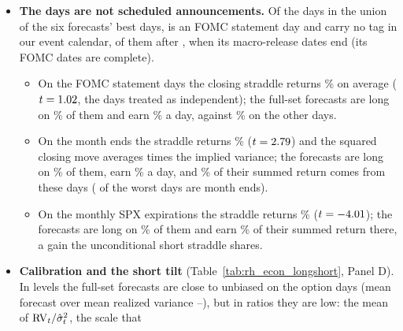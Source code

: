 \begin{itemize}
\begin{itemize}
  \item The largest, \rhedTopDate, returned \rhedTopR\% of the premium on a closing-half-hour move of
    \rhedTopMove\% (realized variance \rhedTopRVIV{} times the implied), \rhedTopShareMin--\rhedTopShareMax\% of each
    full-set strategy's summed return.
  \item Against the HAR-set forecast of the same class the gain is less concentrated: without the forecast's ten best
    days the Sharpe ratio gain falls from \rhedDHarAllMin--\rhedDHarAllMax{} to \rhedDHarExBestMin--\rhedDHarExBestMax,
    and those days carry \rhedHarBestShareMin--\rhedHarBestShareMax\% of the summed return gain over it.
  \end{itemize}
\item \textbf{The days are not scheduled announcements.} Of the \rhedBestUnion{} days in the union of the six
  forecasts' best days, \rhedBestFomcN{} is an FOMC statement day and \rhedBestNoTagN{} carry no tag in our event
  calendar, \rhedBestAfterRelN{} of them after \rhedRelEndText, when its macro-release dates end (its FOMC dates are
  complete).
  \begin{itemize}
  \item On the \rhedFomcN{} FOMC statement days the closing straddle returns \rhedFomcR\% on average
    ($t = 1.02$, the days treated as independent); the full-set forecasts are long on \rhedFomcLong\% of them
    and earn \rhedFomcStrat\% a day, against \rhedFomcOtherStrat\% on the other days.
  \item On the \rhedMeN{} month ends the straddle returns \rhedMeR\% ($t = 2.79$) and the squared closing move
    averages \rhedMeMoveSqIV{} times the implied variance; the forecasts are long on \rhedMeLong\% of them, earn
    \rhedMeStrat\% a day, and \rhedMeShare\% of their summed return comes from these days (\rhedWorstMeN{} of the
    worst days are month ends).
  \item On the \rhedOpexN{} monthly SPX expirations the straddle returns \rhedOpexR\% ($t = -4.01$); the
    forecasts are long on \rhedOpexLong\% of them and earn \rhedOpexShare\% of their summed return there, a gain the
    unconditional short straddle shares.
  \end{itemize}
\item \textbf{Calibration and the short tilt} (Table~\ref{tab:rh_econ_longshort}, Panel D). In levels the full-set
  forecasts are close to unbiased on the option days (mean forecast over mean realized variance
  \rhedCalLevelMin--\rhedCalLevelMax), but in ratios they are low: the mean of $\mathrm{RV}_t/\hat\sigma^2_t$, the scale that

\end{itemize}
